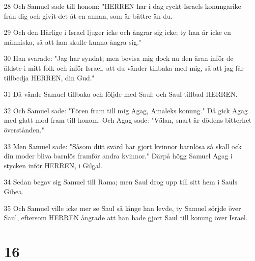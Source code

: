 \par 28 Och Samuel sade till honom: "HERREN har i dag ryckt Israels konungarike från dig och givit det åt en annan, som är bättre än du.
\par 29 Och den Härlige i Israel ljuger icke och ångrar sig icke; ty han är icke en människa, så att han skulle kunna ångra sig."
\par 30 Han svarade: "Jag har syndat; men bevisa mig dock nu den äran inför de äldste i mitt folk och inför Israel, att du vänder tillbaka med mig, så att jag får tillbedja HERREN, din Gud."
\par 31 Då vände Samuel tillbaka och följde med Saul; och Saul tillbad HERREN.
\par 32 Och Samuel sade: "Fören fram till mig Agag, Amaleks konung." Då gick Agag med glatt mod fram till honom. Och Agag sade: "Välan, snart är dödens bitterhet överstånden."
\par 33 Men Samuel sade: "Såsom ditt svärd har gjort kvinnor barnlösa så skall ock din moder bliva barnlös framför andra kvinnor." Därpå högg Samuel Agag i stycken inför HERREN, i Gilgal.
\par 34 Sedan begav sig Samuel till Rama; men Saul drog upp till sitt hem i Sauls Gibea.
\par 35 Och Samuel ville icke mer se Saul så länge han levde, ty Samuel sörjde över Saul, eftersom HERREN ångrade att han hade gjort Saul till konung över Israel.

\chapter{16}

